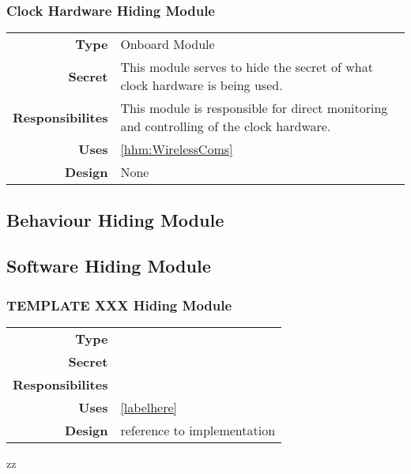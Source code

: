 \documentclass[10pt]{article}
\makeatletter
\newcommand{\CustomLabel}[1]{\Hy@raisedlink{\hypertarget{#1}{}}\label{#1}}
\makeatother
\begin{document}
    \subsubsection{Clock Hardware Hiding Module}\CustomLabel{hhm:Clock}
        \begin{tabularx}{\linewidth}{ >{\bfseries}r X }
            Type            & Onboard Module \\
            Secret          & This module serves to hide the secret of what clock hardware is being used. \\
            Responsibilites & This module is responsible for direct monitoring and controlling of the clock hardware. \\
            Uses            & \ref{hhm:WirelessComs} \\
            Design          & None \\
        \end{tabularx}
        
\subsection{Behaviour Hiding Module}


\subsection{Software Hiding Module}

    \subsubsection{ TEMPLATE XXX Hiding Module}\label{hhm:TEMPLATE}
        \begin{tabularx}{\linewidth}{ >{\bfseries}r X }
            Type            &  \\
            Secret          &  \\
            Responsibilites &  \\
            Uses            & \ref{labelhere} \\ %
            Design          &  reference to implementation \\ %
        \end{tabularx}
        
\newpage
zz
\end{document}
